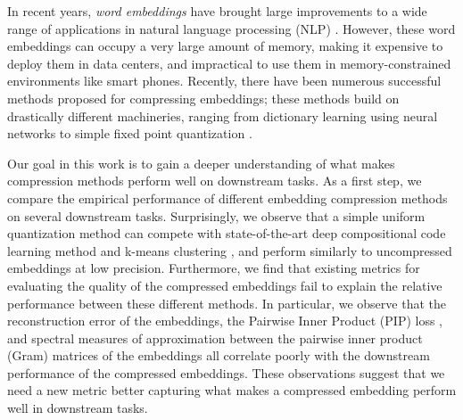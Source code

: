 In recent years, \textit{word embeddings} \citep{word2vec13,glove14,fasttext18} have brought large improvements to a wide range of applications in natural language processing (NLP) \citep{collins16,drqa17}.
However, these word embeddings can occupy a very large amount of memory, making it expensive to deploy them in data centers, and impractical to use them in memory-constrained environments like smart phones.
Recently, there have been numerous successful methods proposed for compressing embeddings;
these methods build on drastically different machineries, ranging from dictionary learning \citep{sparse16,dccl17,kway18} using neural networks to simple fixed point quantization \citep{andrews16,lam2018word2bits}. %

Our goal in this work is to gain a deeper understanding of what makes compression methods perform well on downstream tasks.
As a first step, we compare the empirical performance of different embedding compression methods on several downstream tasks.
Surprisingly, we observe that a simple uniform quantization method can compete with state-of-the-art deep compositional code learning method \citep{dccl17} and k-means clustering \citep{andrews16}, and perform similarly to uncompressed embeddings at low precision.
Furthermore, we find that existing metrics for evaluating the quality of the compressed embeddings fail to explain the relative performance between these different methods.
In particular, we observe that the reconstruction error of the embeddings, the Pairwise Inner Product (PIP) loss \citep{yin18}, and spectral measures of approximation between the pairwise inner product (Gram) matrices of the embeddings \citep{avron17,lprff18} all correlate poorly with the downstream performance of the compressed embeddings. 
These observations suggest that we need a new metric better capturing what makes a compressed embedding perform well in downstream tasks.


